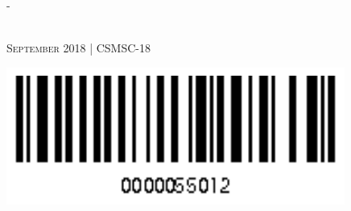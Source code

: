 \begin{titlingpage}
\begin{SingleSpace}
\begin{adjustwidth*}{\unitlength}{-\unitlength}
\begin{center}
\begin{minipage}{10cm}
\end{minipage}\\

\vspace{20mm}
{\large\textsc{September 2018 | CSMSC-18}} 
\vspace{12mm}
\end{center}

\immediate{} \newcommand\wordcount{} 
\immediate{} \newcommand\charcount{}

\begin{flushright}
\vspace{15mm}
\includegraphics[scale=0.6]{images/barcode}
\end{flushright}
\end{adjustwidth*}
\end{SingleSpace}
\end{titlingpage}
